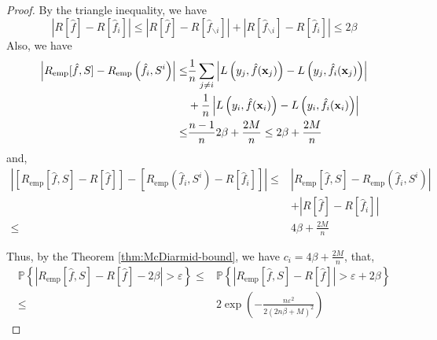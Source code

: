 \begin{proof}
	By the triangle inequality, we have
	\begin{equation}
		\left|R[\hat{f}]-R[\hat{f}_{i}]\right|\leq\left|R[\hat{f}]-R[\hat{f}_{\backslash i}]\right|+\left|R[\hat{f}_{\backslash i}]-R[\hat{f}_{i}]\right|\leq 2\beta
	\end{equation}
	Also, we have
	\begin{equation}
		\begin{aligned}
			\left|R_{\text{emp}}[\hat{f},S]-R_{\text{emp}}\left(\hat{f}_{i},S^{i}\right)\right|\leq & \frac{1}{n}\sum_{j\neq i}\left|L\left(y_{j},\hat{f}({\bf x}_{j})\right)-L\left(y_{j},\hat{f}_{i}({\bf x}_{j})\right)\right| \\
			                                                                                        & +\frac{1}{n}\left|L\left(y_{i},\hat{f}({\bf x}_{i})\right)-L\left(y_{i},\hat{f}_{i}({\bf x}_{i})\right)\right|              \\
			\leq                                                                                    & \frac{n-1}{n}2\beta+\frac{2M}{n}\leq 2\beta+\frac{2M}{n}
		\end{aligned}
	\end{equation}
	and,
	\begin{equation}
		\begin{aligned}
			\left|\left[R_{\text{emp}}[\hat{f},S]-R[\hat{f}]\right]-\left[R_{\text{emp}}\left(\hat{f}_{i},S^{i}\right)-R[\hat{f}_{i}]\right]\right|\leq & \left|R_{\text{emp}}[\hat{f},S]-R_{\text{emp}}\left(\hat{f}_{i},S^{i}\right)\right| \\
			                                                                                                                                            & +\left|R[\hat{f}]-R[\hat{f}_{i}]\right|                                             \\
			\leq                                                                                                                                        & 4\beta+\frac{2M}{n}
		\end{aligned}
	\end{equation}

	Thus, by the Theorem \ref{thm:McDiarmid-bound}, we have $c_{i}=4\beta+\frac{2M}{n}$, that,
	\begin{equation}
		\begin{aligned}
			\mathbb{P}\left\{|R_{\text{emp}}[\hat{f},S]-R[\hat{f}]-2\beta|>\varepsilon\right\}\leq & \mathbb{P}\left\{|R_{\text{emp}}[\hat{f},S]-R[\hat{f}]|>\varepsilon+2\beta\right\} \\
			\leq                                                                                   & 2\exp\left(-\frac{n\varepsilon^{2}}{2(2n\beta+M)^{2}}\right)
		\end{aligned}
	\end{equation}
\end{proof}

